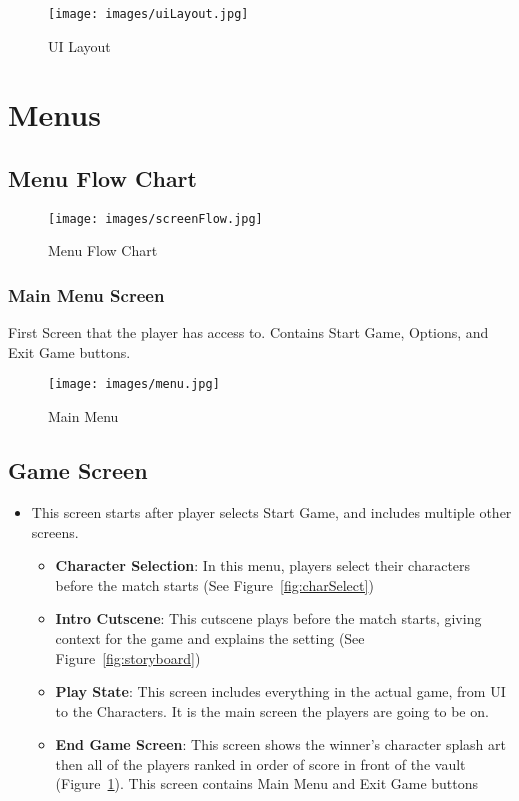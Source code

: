 \documentclass[10pt]{report}
\begin{document}
\begin{figure}[H]
	\texttt{[image: images/uiLayout.jpg]}
    \caption{UI Layout}
    \label{fig:uilayout}
\end{figure}

\section{Menus}

\subsection{Menu Flow Chart}

\begin{figure}[H]
    \centering
    \texttt{[image: images/screenFlow.jpg]}
    \caption{Menu Flow Chart}
\end{figure}

\subsubsection{Main Menu Screen}

First Screen that the player has access to. Contains Start Game, Options, and Exit Game buttons.

\begin{figure}[H]
    \centering
    \texttt{[image: images/menu.jpg]}
    \caption{Main Menu}
\end{figure}

\subsection{Game Screen}

\begin{itemize}
    \item This screen starts after player selects Start Game, and includes multiple other screens.
    \begin{itemize}    
        \item \textbf{Character Selection}: In this menu, players select their characters before the match starts (See Figure~\ref{fig:charSelect})
        \item \textbf{Intro Cutscene}: This cutscene plays before the match starts, giving context for the game and explains the setting (See Figure~\ref{fig:storyboard})
        \item \textbf{Play State}: This screen includes everything in the actual game, from UI to the Characters. It is the main screen the players are going to be on.
        \item \textbf{End Game Screen}: This screen shows the winner’s character splash art then all of the players ranked in order of score in front of the vault (Figure~\ref{fig:uilayout}). This screen contains Main Menu and Exit Game buttons
    \end{itemize}
\end{itemize}
\end{document}
